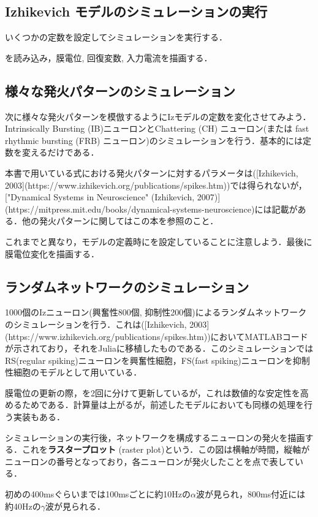 \subsection{Izhikevich モデルのシミュレーションの実行}
いくつかの定数を設定してシミュレーションを実行する．

を読み込み，膜電位, 回復変数, 入力電流を描画する．


\subsection{様々な発火パターンのシミュレーション}
次に様々な発火パターンを模倣するようにIzモデルの定数を変化させてみよう．Intrinsically Bursting (IB)ニューロンとChattering (CH) ニューロン(または fast rhythmic bursting (FRB) ニューロン)のシミュレーションを行う．基本的には定数を変えるだけである．

本書で用いている式における発火パターンに対するパラメータは([Izhikevich, 2003](https://www.izhikevich.org/publications/spikes.htm))では得られないが，["Dynamical Systems in Neuroscience" (Izhikevich, 2007)](https://mitpress.mit.edu/books/dynamical-systems-neuroscience)には記載がある．他の発火パターンに関してはこの本を参照のこと．

これまでと異なり，モデルの定義時にを設定していることに注意しよう．最後に膜電位変化を描画する．


\subsection{ランダムネットワークのシミュレーション}
1000個のIzニューロン(興奮性800個, 抑制性200個)によるランダムネットワークのシミュレーションを行う．これは([Izhikevich, 2003](https://www.izhikevich.org/publications/spikes.htm))においてMATLABコードが示されており，それをJuliaに移植したものである．このシミュレーションではRS(regular spiking)ニューロンを興奮性細胞，FS(fast spiking)ニューロンを抑制性細胞のモデルとして用いている．

膜電位の更新の際，を2回に分けて更新しているが，これは数値的な安定性を高めるためである．計算量は上がるが，前述したモデルにおいても同様の処理を行う実装もある．

シミュレーションの実行後，ネットワークを構成するニューロンの発火を描画する．これを\textbf{ラスタープロット} (raster plot)という．この図は横軸が時間，縦軸がニューロンの番号となっており，各ニューロンが発火したことを点で表している．


初めの400msぐらいまでは100msごとに約10Hzの$\alpha$波が見られ，800ms付近には約40Hzの$\gamma$波が見られる．
